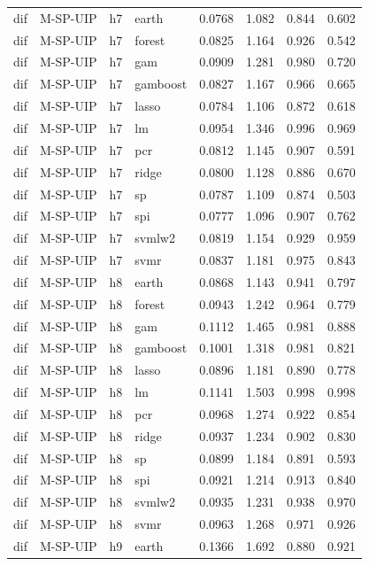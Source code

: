 \begin{ThreePartTable}
\begin{longtable}[t]{llclcccc}
\addlinespace
dif & M-SP-UIP & h7 & earth & 0.0768 & 1.082 & 0.844 & 0.602\\
dif & M-SP-UIP & h7 & forest & 0.0825 & 1.164 & 0.926 & 0.542\\
dif & M-SP-UIP & h7 & gam & 0.0909 & 1.281 & 0.980 & 0.720\\
dif & M-SP-UIP & h7 & gamboost & 0.0827 & 1.167 & 0.966 & 0.665\\
dif & M-SP-UIP & h7 & lasso & 0.0784 & 1.106 & 0.872 & 0.618\\
dif & M-SP-UIP & h7 & lm & 0.0954 & 1.346 & 0.996 & 0.969\\
dif & M-SP-UIP & h7 & pcr & 0.0812 & 1.145 & 0.907 & 0.591\\
dif & M-SP-UIP & h7 & ridge & 0.0800 & 1.128 & 0.886 & 0.670\\
dif & M-SP-UIP & h7 & sp & 0.0787 & 1.109 & 0.874 & 0.503\\
dif & M-SP-UIP & h7 & spi & 0.0777 & 1.096 & 0.907 & 0.762\\
dif & M-SP-UIP & h7 & svmlw2 & 0.0819 & 1.154 & 0.929 & 0.959\\
dif & M-SP-UIP & h7 & svmr & 0.0837 & 1.181 & 0.975 & 0.843\\
\addlinespace
dif & M-SP-UIP & h8 & earth & 0.0868 & 1.143 & 0.941 & 0.797\\
dif & M-SP-UIP & h8 & forest & 0.0943 & 1.242 & 0.964 & 0.779\\
dif & M-SP-UIP & h8 & gam & 0.1112 & 1.465 & 0.981 & 0.888\\
dif & M-SP-UIP & h8 & gamboost & 0.1001 & 1.318 & 0.981 & 0.821\\
dif & M-SP-UIP & h8 & lasso & 0.0896 & 1.181 & 0.890 & 0.778\\
dif & M-SP-UIP & h8 & lm & 0.1141 & 1.503 & 0.998 & 0.998\\
dif & M-SP-UIP & h8 & pcr & 0.0968 & 1.274 & 0.922 & 0.854\\
dif & M-SP-UIP & h8 & ridge & 0.0937 & 1.234 & 0.902 & 0.830\\
dif & M-SP-UIP & h8 & sp & 0.0899 & 1.184 & 0.891 & 0.593\\
dif & M-SP-UIP & h8 & spi & 0.0921 & 1.214 & 0.913 & 0.840\\
dif & M-SP-UIP & h8 & svmlw2 & 0.0935 & 1.231 & 0.938 & 0.970\\
dif & M-SP-UIP & h8 & svmr & 0.0963 & 1.268 & 0.971 & 0.926\\
\addlinespace
dif & M-SP-UIP & h9 & earth & 0.1366 & 1.692 & 0.880 & 0.921\\

\end{longtable}
\end{ThreePartTable}
